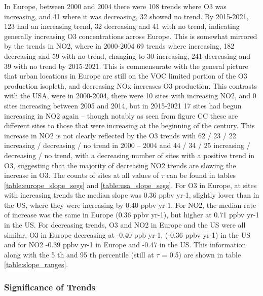 \documentclass[journal abbreviation, manuscript]{copernicus}
\begin{document}
In Europe, between 2000 and 2004 there were 108 trends where O3 was increasing, and 41 where it was decreasing, 32 showed no trend. By 2015-2021, 123 had an increasing trend, 32 decreasing and 41 with no trend, indicating generally increasing O3 concentrations across Europe. This is somewhat mirrored by the trends in NO2, where in 2000-2004 69 trends where increasing, 182 decreasing and 59 with no trend, changing to 30 increasing, 241 decreasing and 39 with no trend by 2015-2021. This is commensurate with the general picture that urban locations in Europe are still on the VOC limited portion of the O3 production isopleth, and decreasing NOx increases O3 production. 
This contrasts with the USA, were in 2000-2004, there were 10 sites with increasing NO2, and 0 sites increasing between 2005 and 2014, but in 2015-2021 17 sites had begun increasing in NO2 again – though notably as seen from figure CC these are different sites to those that were increasing at the beginning of the century. This increase in NO2 is not clearly reflected by the O3 trends with 62 / 23 / 22 increasing / decreasing / no trend in 2000 – 2004 and 44 / 34 / 25 increasing / decreasing / no trend, with a decreasing number of sites  with a positive trend in O3, suggesting that the majority of decreasing NO2 trends are slowing the increase in O3. The counts of sites at all values of $\tau$ can be found in tables \ref{table:europe_slope_segs} and \ref{table:usa_slope_segs}. 
For O3 in Europe, at sites with increasing trends the median slope was 0.36 ppbv yr-1, slightly lower than in the US, where they were increasing by 0.40 ppbv yr-1. For NO2, the median rate of increase was the same in Europe (0.36 ppbv yr-1), but higher at 0.71 ppbv yr-1 in the US. For decreasing trends, O3 and NO2 in Europe and the US were all similar, O3 in Europe decreasing at -0.40 ppb yr-1, (-0.36 ppbv yr-1) in the US and for NO2 -0.39 ppbv yr-1 in Europe and -0.47 in the US. This information along with the 5 th and 95 th percentile (still at $\tau$ = 0.5) are shown in table \ref{table:slope_ranges}. 










\subsubsection{Significance of Trends} \label{sect:significance_of_trends}
\end{document}
